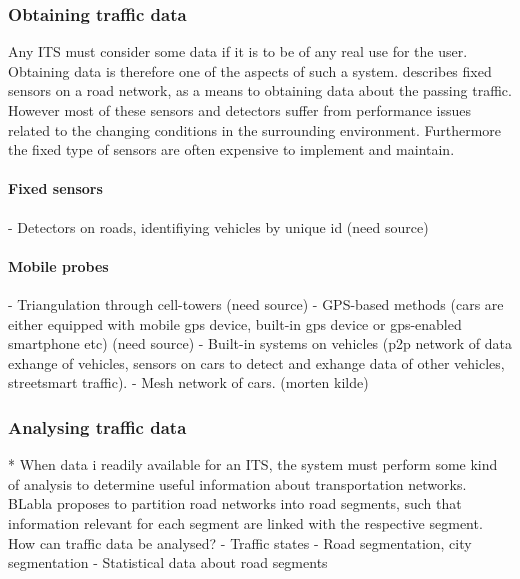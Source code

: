 \subsubsection*{Obtaining traffic data}
Any ITS must consider some data if it is to be of any real use for the user. Obtaining data is therefore one of the aspects of such a system. \cite{KamranHaas2007} describes fixed sensors on a road network, as a means to obtaining data about the passing traffic. However most of these sensors and detectors suffer from performance issues related to the changing conditions in the surrounding environment. Furthermore the fixed type of sensors are often expensive to implement and maintain\cite{KamranHaas2007}. %

\paragraph{Fixed sensors}
- Detectors on roads, identifiying vehicles by unique id (need source)


\paragraph{Mobile probes}
- Triangulation through cell-towers (need source)
- GPS-based methods (cars are either equipped with mobile gps device, built-in gps device or gps-enabled smartphone etc) (need source)
- Built-in systems on vehicles (p2p network of data exhange of vehicles, sensors on cars to detect and exhange data of other vehicles, streetsmart traffic).
- Mesh network of cars. (morten kilde)

\subsubsection*{Analysing traffic data}*
When data i readily available for an ITS, the system must perform some kind of analysis to determine useful information about transportation networks. BLabla proposes to partition road networks into road segments, such that information relevant for each segment are linked with the respective segment. 
How can traffic data be analysed?
- Traffic states
- Road segmentation, city segmentation
- Statistical data about road segments 